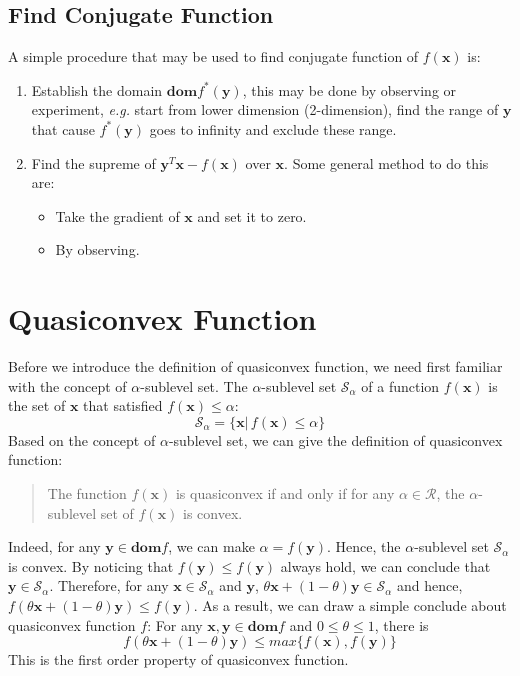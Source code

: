 \documentclass[10pt,a4paper]{article}
\begin{document}
\subsection{Find Conjugate Function}
A simple procedure that may be used to find conjugate function of $f(\mathbf{x})$ is:
\begin{enumerate}
	\item Establish the domain $\mathbf{dom}f^{*}(\mathbf{y})$, this may be done by observing or experiment, \textsl{e.g.} start from lower dimension (2-dimension), find the range of $\mathbf{y}$ that cause $f^{*}(\mathbf{y})$ goes to infinity and exclude these range.
	\item Find the supreme of $\mathbf{y}^{T} \mathbf{x} - f(\mathbf{x})$ over $\mathbf{x}$. Some general method to do this are:
	\begin{itemize}
		\item Take the gradient of $\mathbf{x}$ and set it to zero.
		\item By observing.
	\end{itemize}
\end{enumerate} 

\section{Quasiconvex Function}

Before we introduce the definition of quasiconvex function, we need first familiar with the concept of $\alpha$-sublevel set. The $\alpha$-sublevel set $\mathcal{S}_{\alpha}$ of a function $f(\mathbf{x})$ is the set of $\mathbf{x}$ that satisfied $f(\mathbf{x}) \leq \alpha$:
\begin{equation}
	\mathcal{S}_{\alpha} = \{ \mathbf{x} |\, f(\mathbf{x}) \leq \alpha \}
\end{equation}
Based on the concept of $\alpha$-sublevel set, we can give the definition of quasiconvex function:
\begin{center}
	\begin{quote}
		The function $f(\mathbf{x})$ is quasiconvex if and only if for any $\alpha \in \mathcal{R}$, the $\alpha$-sublevel set of $f(\mathbf{x})$ is convex.
	\end{quote}
\end{center}
Indeed, for any $\mathbf{y} \in \mathbf{dom}f$, we can make $\alpha = f(\mathbf{y})$. Hence, the $\alpha$-sublevel set $\mathcal{S}_{\alpha}$ is convex. By noticing that $f(\mathbf{y}) \leq f(\mathbf{y})$ always hold, we can conclude that $\mathbf{y} \in \mathcal{S}_{\alpha}$. Therefore, for any $\mathbf{x} \in \mathcal{S}_{\alpha}$ and $\mathbf{y}$, $\theta \mathbf{x} + (1 - \theta) \mathbf{y} \in \mathcal{S}_{\alpha}$ and hence, $f(\theta \mathbf{x} + (1 - \theta) \mathbf{y}) \leq f(\mathbf{y})$. As a result, we can draw a simple conclude about quasiconvex function $f$: For any $\mathbf{x}, \mathbf{y} \in \mathbf{dom}f$ and $0 \leq \theta \leq 1$, there is
\begin{equation}
	f(\theta \mathbf{x} + (1 - \theta) \mathbf{y}) \leq max\{ f(\mathbf{x}), f(\mathbf{y}) \}
\end{equation}
This is the first order property of quasiconvex function.
\end{document}
